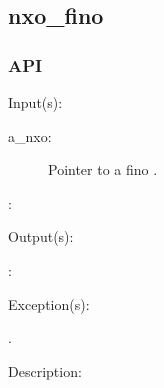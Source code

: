 %
%
%
%
%              

\subsection{nxo\_fino}
\label{nxo_fino}

\subsubsection{API}
\begin{capi}
\label{nxo_fino_}
	\begin{capilist}
	\item[Input(s): ]
		\begin{description}\item[]
		\item[a\_nxo: ]
			Pointer to a fino .
		\item[: ]
		\end{description}
	\item[Output(s): ]
		\begin{description}\item[]
		\item[: ]
		\end{description}
	\item[Exception(s): ]
		\begin{description}\item[]
		\item[.]
		\end{description}
	\item[Description: ]
	\end{capilist}
\end{capi}
